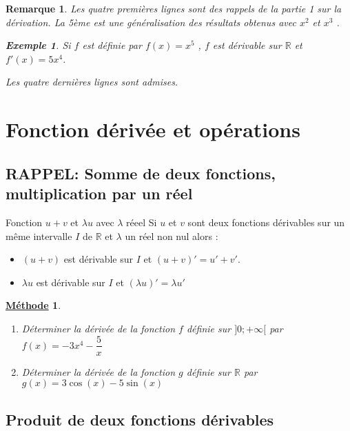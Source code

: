 \documentclass[11pt,a4paper]{article}
\def\R{{\mathbb R}}
\theoremstyle{break}
\newtheorem{Rem}{Remarque}
\newtheorem{Ex}{Exemple}
\newtheorem{Meth}{\underline{Méthode}}
\begin{document}
\begin{Rem}
Les quatre premières lignes sont des rappels de la partie 1 sur la dérivation. La 5ème est une généralisation des résultats obtenus avec $x^2$ et $x^3$ .\\
\begin{Ex}
	Si $f$ est définie par $f(x)=x^5$ , $f$ est dérivable sur $\R$ et $f'(x)=5x^4$.
\end{Ex}
Les quatre dernières lignes sont admises.	
\end{Rem} 
\section{Fonction dérivée et opérations}
	\subsection{RAPPEL: Somme de deux fonctions, multiplication par un réel}
\begin{bclogo}[couleur = yellow!30, arrondi = 0.1,logo=\bcbook]{Fonction $u+v$ et $\lambda u$ avec $\lambda$ réeel}
	Si $u$ et $v$ sont deux fonctions dérivables sur un même intervalle $I$ de $\R$ et $\lambda$ un réel non nul alors :
	\begin{itemize}
		\item $(u+v)$ est dérivable sur $I$ et $(u+v)'=u'+v'$.
		\item $\lambda u$ est dérivable sur  $I$ et $(\lambda u)'= \lambda u'$
	\end{itemize} 
\end{bclogo}
\begin{Meth}
	\begin{enumerate}
		\item Déterminer la dérivée de la fonction $f$ définie sur $]0;+\infty[$ par $f(x)=-3x^4-\dfrac5x$
		\item Déterminer la dérivée de la fonction $g$ définie sur $\R$ par $g(x)=3\cos(x)-5\sin(x)$
	\end{enumerate}
	
\end{Meth} 
\subsection{Produit de deux fonctions dérivables}
\end{document}
